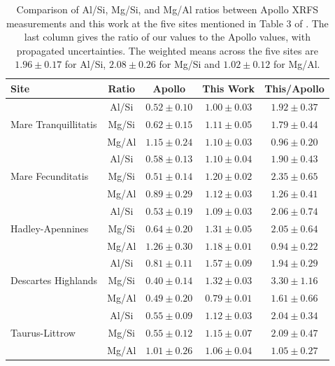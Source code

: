 \documentclass[twocolumn,linenumbers]{aastex631}
\newcommand{\revtwo}[1]{#1}
\begin{document}
\begin{table}[!t]
    \centering
    \footnotesize
    \setlength{\tabcolsep}{3pt}
    \begin{tabular}{|l|c|c|c|c|}
        \hline
        Site & Ratio & Apollo & This Work & \revtwo{This/Apollo} \\
        \hline
        \multirow{3}{1.6cm}{Mare Tranquil\-litatis}
            & Al/Si & $0.52 \pm 0.10$ & $1.00 \pm 0.03$ & \revtwo{$1.92 \pm 0.37$} \\
            & Mg/Si & $0.62 \pm 0.15$ & $1.11 \pm 0.05$ & \revtwo{$1.79 \pm 0.44$} \\
            & Mg/Al & $1.15 \pm 0.24$ & $1.10 \pm 0.03$ & \revtwo{$0.96 \pm 0.20$} \\
        \hline
        \multirow{3}{1.6cm}{Mare Fecunditatis}
            & Al/Si & $0.58 \pm 0.13$ & $1.10 \pm 0.04$ & \revtwo{$1.90 \pm 0.43$} \\
            & Mg/Si & $0.51 \pm 0.14$ & $1.20 \pm 0.02$ & \revtwo{$2.35 \pm 0.65$} \\
            & Mg/Al & $0.89 \pm 0.29$ & $1.12 \pm 0.03$ & \revtwo{$1.26 \pm 0.41$} \\
        \hline
        \multirow{3}{1.6cm}{Hadley-Apennines}
            & Al/Si & $0.53 \pm 0.19$ & $1.09 \pm 0.03$ & \revtwo{$2.06 \pm 0.74$} \\
            & Mg/Si & $0.64 \pm 0.20$ & $1.31 \pm 0.05$ & \revtwo{$2.05 \pm 0.64$} \\
            & Mg/Al & $1.26 \pm 0.30$ & $1.18 \pm 0.01$ & \revtwo{$0.94 \pm 0.22$} \\
        \hline
        \multirow{3}{1.6cm}{Descartes Highlands}
            & Al/Si & $0.81 \pm 0.11$ & $1.57 \pm 0.09$ & \revtwo{$1.94 \pm 0.29$} \\
            & Mg/Si & $0.40 \pm 0.14$ & $1.32 \pm 0.03$ & \revtwo{$3.30 \pm 1.16$} \\
            & Mg/Al & $0.49 \pm 0.20$ & $0.79 \pm 0.01$ & \revtwo{$1.61 \pm 0.66$} \\
        \hline
        \multirow{3}{1.6cm}{Taurus-Littrow}
            & Al/Si & $0.55 \pm 0.09$ & $1.12 \pm 0.03$ & \revtwo{$2.04 \pm 0.34$} \\
            & Mg/Si & $0.55 \pm 0.12$ & $1.15 \pm 0.07$ & \revtwo{$2.09 \pm 0.47$} \\
            & Mg/Al & $1.01 \pm 0.26$ & $1.06 \pm 0.04$ & \revtwo{$1.05 \pm 0.27$} \\
        \hline
    \end{tabular}
    \caption{Comparison of Al/Si, Mg/Si, and Mg/Al ratios between Apollo XRFS measurements and this work at the five sites mentioned in Table 3 of \citet{Gloudermans2021}. \revtwo{The last column gives the ratio of our values to the Apollo values, with propagated uncertainties. The weighted means across the five sites are $1.96 \pm 0.17$ for Al/Si, $2.08 \pm 0.26$ for Mg/Si and $1.02 \pm 0.12$ for Mg/Al.}}
    \label{tab:apollo_comparison}
\end{table}
\end{document}
